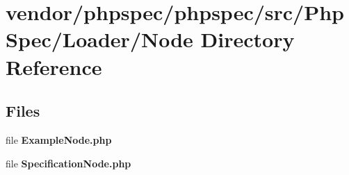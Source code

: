 \section{vendor/phpspec/phpspec/src/\+Php\+Spec/\+Loader/\+Node Directory Reference}
\label{dir_b975bdb666376cc39367d6b16197cde8}
\subsection*{Files}
\begin{DoxyCompactItemize}
\item 
file {\bf Example\+Node.\+php}
\item 
file {\bf Specification\+Node.\+php}
\end{DoxyCompactItemize}
